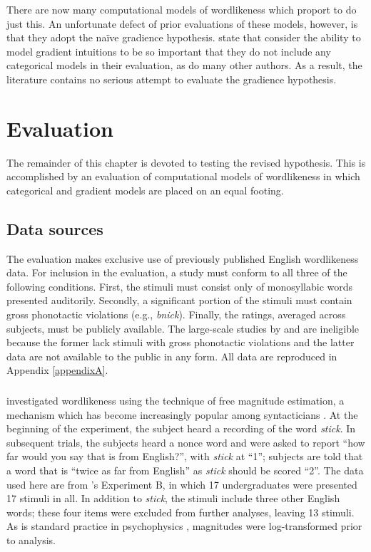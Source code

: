 \noindent There are now many computational models of wordlikeness which proport to do just this. An unfortunate defect of prior evaluations of these models, however, is that they adopt the naïve gradience hypothesis. \citet[382]{Hayes2008a} state that consider the ability to model gradient intuitions to be so important that they do not include any categorical models in their evaluation, as do many other authors. As a result, the literature contains no serious attempt to evaluate the gradience hypothesis.

\section{Evaluation} 
\label{2evaluation}

The remainder of this chapter is devoted to testing the revised hypothesis. This is accomplished by an evaluation of computational models of wordlikeness in which categorical and gradient models are placed on an equal footing.

\subsection{Data sources}

The evaluation makes exclusive use of previously published English wordlikeness data. For inclusion in the evaluation, a study must conform to all three of the following conditions. First, the stimuli must consist only of monosyllabic words presented auditorily. Secondly, a significant portion of the stimuli must contain gross phonotactic violations (e.g., \emph{bnick}). Finally, the ratings, averaged across subjects, must be publicly available. The large-scale studies by \citet{Bailey2001} and \citet{Shademan2006,Shademan2007} are ineligible because the former lack stimuli with gross phonotactic violations and the latter data are not available to the public in any form. All data are reproduced in Appendix \ref{appendixA}.

\subsubsection{\citealt{Greenberg1964}}

\citet{Greenberg1964} investigated wordlikeness using the technique of free magnitude estimation, a mechanism which has become increasingly popular among syntacticians \citep[e.g.,][]{Bard1996}. At the beginning of the experiment, the subject heard a recording of the word \emph{stick}. In subsequent trials, the subjects heard a nonce word and were asked to report ``how far would you say that is from English?'', with \emph{stick} at ``1''; subjects are told that a word that is ``twice as far from English'' as \emph{stick} should be scored ``2''. The data used here are from \citeauthor{Greenberg1964}'s Experiment B, in which 17 undergraduates were presented 17 stimuli in all. In addition to \emph{stick}, the stimuli include three other English words; these four items were excluded from further analyses, leaving 13 stimuli. As is standard practice in psychophysics \citep[e.g.,][]{Butler1987}, magnitudes were log-transformed prior to analysis.

